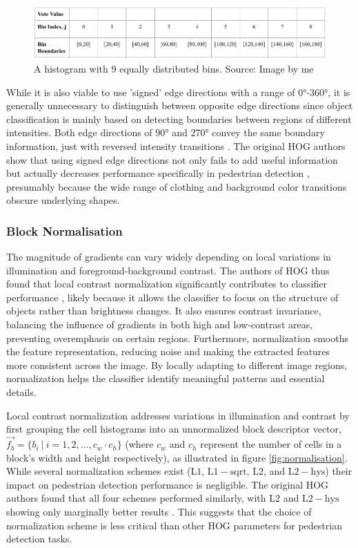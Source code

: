 \begin{figure}
    \centering
    \includegraphics[width=0.75\linewidth]{images/histogram_bins.png}
    \caption{A histogram with 9 equally distributed bins. Source: Image by me}
    \label{fig:histogram_bins}
\end{figure}

While it is also viable to use 'signed' edge directions with a range of 0°-360°, it is generally unnecessary to distinguish between opposite edge directions since object classification is mainly based on detecting boundaries between regions of different intensities. Both edge directions of 90° and 270° convey the same boundary information, just with reversed intensity transitions \cite{shidlovskiy_2020_reducing}. The original HOG authors show that using signed edge directions not only fails to add useful information but actually decreases performance specifically in pedestrian detection \cite{dalal_2005_histograms}, presumably because the wide range of clothing and background color transitions obscure underlying shapes.

\subsubsection{Block Normalisation}
The magnitude of gradients can vary widely depending on local variations in illumination and foreground-background contrast. The authors of HOG thus found that local contrast normalization significantly contributes to classifier performance \cite{dalal_2005_histograms}, likely because it allows the classifier to focus on the structure of objects rather than brightness changes. It also ensures contrast invariance, balancing the influence of gradients in both high and low-contrast areas, preventing overemphasis on certain regions. Furthermore, normalization smooths the feature representation, reducing noise and making the extracted features more consistent across the image. By locally adapting to different image regions, normalization helps the classifier identify meaningful patterns and essential details.

Local contrast normalization addresses variations in illumination and contrast by first grouping the cell histograms into an unnormalized block descriptor vector, $\vec{f_{b}} = \{ b_{i} \ |\ i=1,2,\dots, c_w \cdot c_h \}$ (where $c_w$ and $c_h$ represent the number of cells in a block's width and height respectively), as illustrated in figure \ref{fig:normalisation}. While several normalization schemes exist ($\mathrm{L1}$, $\mathrm{L1-sqrt}$, $\mathrm{L2}$, and $\mathrm{L2-hys}$) \cite{dalal_2005_histograms} their impact on pedestrian detection performance is negligible. The original HOG authors found that all four schemes performed similarly, with $\mathrm{L2}$ and $\mathrm{L2-hys}$ showing only marginally better results \cite{dalal_2005_histograms}. This suggests that the choice of normalization scheme is less critical than other HOG parameters for pedestrian detection tasks.

